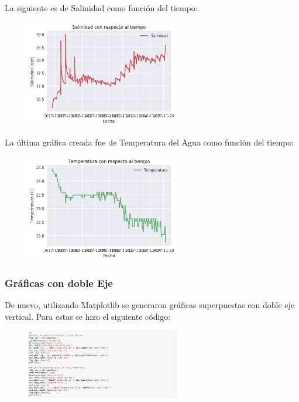 \documentclass[a4paper]{article}
\begin{document}
La siguiente es de Salinidad como función del tiempo:
\begin{figure}[ht!]
 \centering
  \includegraphics[width=0.6\textwidth]{Matplotlib2.png}
\end{figure}

\pagebreak
La última gráfica creada fue de Temperatura del Agua como función del tiempo:
\begin{figure}[ht!]
 \centering
  \includegraphics[width=0.6\textwidth]{Matplotlib3.png}
\end{figure}

\subsubsection{Gráficas con doble Eje}
De nuevo, utilizando Matplotlib se generaron gráficas superpuestas con doble eje vertical. Para estas se hizo el siguiente código:
\begin{figure}[ht!]
 \centering
  \includegraphics[width=0.6\textwidth]{DobleejeCodigo.PNG}
\end{figure}
\end{document}
